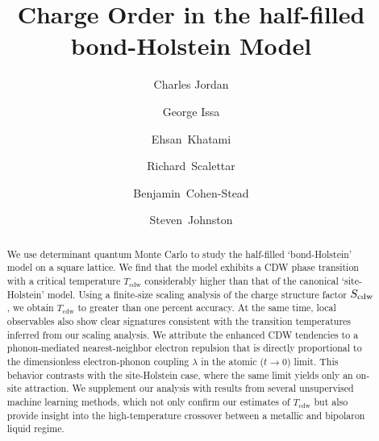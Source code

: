\documentclass[%
reprint,
superscriptaddress,
nofootinbib,
twocolumn,
amsmath,amssymb,
aps,
prb,
]{revtex4-2}
\begin{document}
\title{Charge Order in the half-filled bond-Holstein Model}

\author{Charles Jordan}
\author{George Issa}
\author{Ehsan~Khatami}
\author{Richard~Scalettar}
\author{Benjamin~Cohen-Stead}
\author{Steven~Johnston}



\begin{abstract}
We use determinant quantum Monte Carlo to study the half-filled `bond-Holstein' model on a square lattice. We find that the model exhibits a \gls*{CDW} phase transition with a critical temperature $T_\mathrm{cdw}$ considerably higher than that of the canonical `site-Holstein' model. Using a finite-size scaling analysis of the charge structure factor $S_{\rm cdw}$, we obtain $T_\mathrm{cdw}$ to greater than one percent accuracy. At the same time, local observables also show clear signatures consistent with the transition temperatures inferred from our scaling analysis. We attribute the enhanced \gls*{CDW} tendencies to a phonon-mediated nearest-neighbor electron repulsion that is directly proportional to the dimensionless electron-phonon coupling $\lambda$ in the atomic ($t\rightarrow 0$) limit. This behavior contrasts with the site-Holstein case, where the same limit yields only an on-site attraction. We supplement our analysis with results from several unsupervised machine learning methods, which not only confirm our estimates of $T_\mathrm{cdw}$ but also provide insight into the high-temperature crossover between a metallic and bipolaron liquid regime.
\end{abstract}
\end{document}
